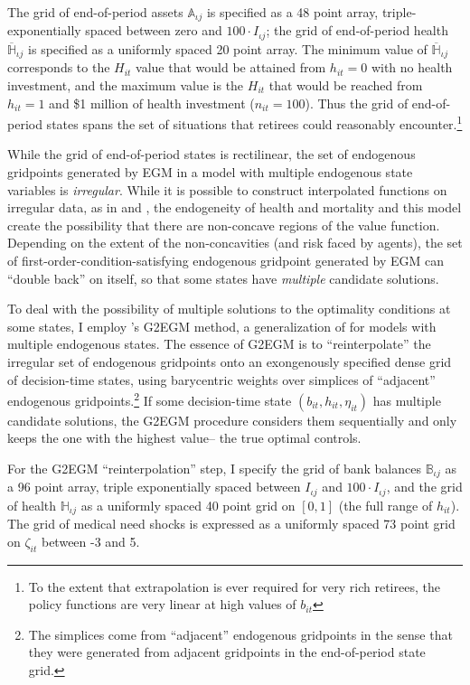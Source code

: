 \documentclass[12pt,pdftex,letterpaper]{article}
\newcommand{\Type}{\iota}
\newcommand{\Health}{h}
\newcommand{\PostHealth}{H}
\newcommand{\Inc}{I}
\newcommand{\Invst}{n}
\newcommand{\Bank}{b}
\newcommand{\Age}{j}
\newcommand{\MedShk}{\eta}
\begin{document}
The grid of end-of-period assets $\mathbb{A}_{\Type \Age}$ is specified as a 48 point array, triple-exponentially spaced between zero and $100 \cdot \Inc_{\Type \Age}$; the grid of end-of-period health $\overline{\mathbb{H}}_{\Type \Age}$ is specified as a uniformly spaced 20 point array.  The minimum value of $\overline{\mathbb{H}}_{\Type \Age}$ corresponds to the $\PostHealth_{it}$ value that would be attained from $\Health_{it} = 0$ with no health investment, and the maximum value is the $\PostHealth_{it}$ that would be reached from $\Health_{it} = 1$ and \$1 million of health investment ($\Invst_{it} = 100$).  Thus the grid of end-of-period states spans the set of situations that retirees could reasonably encounter.\footnote{To the extent that extrapolation is ever required for very rich retirees, the policy functions are very linear at high values of $\Bank_{it}$}

While the grid of end-of-period states is rectilinear, the set of endogenous gridpoints generated by EGM in a model with multiple endogenous state variables is \textit{irregular}.  While it is possible to construct interpolated functions on irregular data, as in \cite{ludwig18} and \cite{white15}, the endogeneity of health and mortality and this model create the possibility that there are non-concave regions of the value function.  Depending on the extent of the non-concavities (and risk faced by agents), the set of first-order-condition-satisfying endogenous gridpoint generated by EGM can ``double back'' on itself, so that some states have \textit{multiple} candidate solutions.

To deal with the possibility of multiple solutions to the optimality conditions at some states, I employ \cite{jorgensen17}'s G2EGM method, a generalization of \cite{fella14} for models with multiple endogenous states.  The essence of G2EGM is to ``reinterpolate'' the irregular set of endogenous gridpoints onto an exongenously specified dense grid of decision-time states, using barycentric weights over simplices of ``adjacent'' endogenous gridpoints.\footnote{The simplices come from ``adjacent'' endogenous gridpoints in the sense that they were generated from adjacent gridpoints in the end-of-period state grid.}  If some decision-time state $(\Bank_{it},\Health_{it},\MedShk_{it})$ has multiple candidate solutions, the G2EGM procedure considers them sequentially and only keeps the one with the highest value-- the true optimal controls.

For the G2EGM ``reinterpolation'' step, I specify the grid of bank balances $\mathbb{B}_{\Type \Age}$ as a 96 point array, triple exponentially spaced between $\Inc_{\Type \Age}$ and $100 \cdot \Inc_{\Type \Age}$, and the grid of health $\mathbb{H}_{\Type \Age}$ as a uniformly spaced 40 point grid on $[0,1]$ (the full range of $\Health_{it}$).  The grid of medical need shocks is expressed as a uniformly spaced 73 point grid on $\zeta_{it}$ between -3 and 5.
\end{document}
